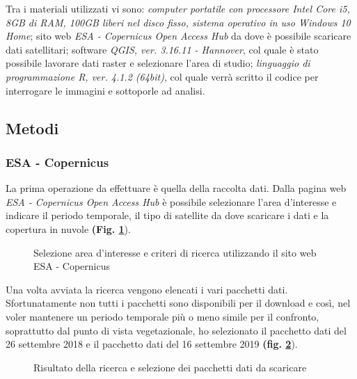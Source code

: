 \documentclass[a4paper,12pt]{article}
\begin{document}
Tra i materiali utilizzati vi sono: \textit{computer portatile con processore Intel Core i5, 8GB di RAM, 100GB liberi nel disco fisso, sistema operativo in uso Windows 10 Home}; sito web \textit{ESA - Copernicus Open Access Hub} da dove è possibile scaricare dati satellitari; software \textit{QGIS, ver. 3.16.11 - Hannover}, col quale è stato possibile lavorare dati raster e selezionare l'area di studio; \textit{linguaggio di programmazione R, ver. 4.1.2 (64bit)}, col quale verrà scritto il codice per interrogare le immagini e sottoporle ad analisi.

\subsection{Metodi}

\subsubsection{ESA - Copernicus}

La prima operazione da effettuare è quella della raccolta dati. Dalla pagina web \textit{ESA - Copernicus Open Access Hub} è possibile selezionare l'area d'interesse e indicare il periodo temporale, il tipo di satellite da dove scaricare i dati e la copertura in nuvole \textbf{(Fig. \ref{fig:copernicus_area_search}}). 

\begin{figure}
\centering
    \setlength{\fboxsep}{0pt}%
    \setlength{\fboxrule}{1pt}%
    \caption{Selezione area d'interesse e criteri di ricerca utilizzando il sito web ESA - Copernicus}
    \label{fig:copernicus_area_search}
\end{figure}

Una volta avviata la ricerca vengono elencati i vari pacchetti dati. Sfortunatamente non tutti i pacchetti sono disponibili per il download e così, nel voler mantenere un periodo temporale più o meno simile per il confronto, soprattutto dal punto di vista vegetazionale, ho selezionato il pacchetto dati del 26 settembre 2018 e il pacchetto dati del 16 settembre 2019 \textbf{(fig. \ref{fig:copernicus_select}}). 

\begin{figure}
\centering
    \setlength{\fboxsep}{0pt}%
    \setlength{\fboxrule}{1pt}%
    \caption{Risultato della ricerca e selezione dei pacchetti dati da scaricare}
    \label{fig:copernicus_select}
\end{figure}
\end{document}
